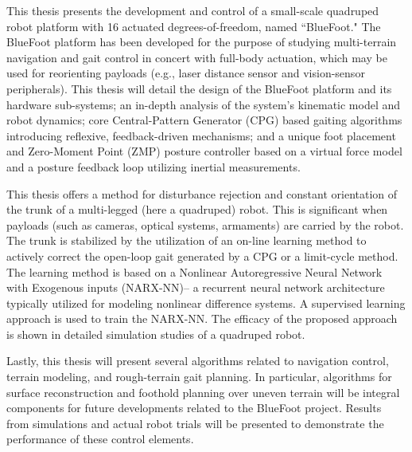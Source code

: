 {

	This thesis presents the development and control of a small-scale quadruped robot platform with 16 actuated degrees-of-freedom, named ``BlueFoot." The BlueFoot platform has been developed for the purpose of studying multi-terrain navigation and gait control in concert with full-body actuation, which may be used for reorienting payloads (e.g., laser distance sensor and vision-sensor peripherals). This thesis will detail the design of the BlueFoot platform and its hardware sub-systems; an in-depth analysis of the system's kinematic model and robot dynamics; core Central-Pattern Generator (CPG) based gaiting algorithms introducing reflexive, feedback-driven mechanisms; and a unique foot placement and Zero-Moment Point (ZMP) posture controller based on a virtual force model and a posture feedback loop utilizing inertial measurements. %

	This thesis offers a method for disturbance rejection and constant orientation of the trunk of a multi-legged (here a quadruped) robot. This is significant when payloads (such as cameras, optical systems, armaments) are carried by the robot.  The trunk is stabilized by the utilization of an on-line learning method to actively correct the open-loop gait generated by a CPG or a limit-cycle method. The learning method is based on a Nonlinear Autoregressive Neural Network with Exogenous inputs (NARX-NN)-- a recurrent neural network architecture typically utilized for modeling nonlinear difference systems. A supervised learning approach is used to train the NARX-NN. 
	The efficacy of the proposed approach is shown in detailed simulation studies of a quadruped robot. 

	Lastly, this thesis will present several algorithms related to navigation control, terrain modeling, and rough-terrain gait planning. In particular, algorithms for surface reconstruction and foothold planning over uneven terrain will be integral components for future developments related to the BlueFoot project. Results from simulations and actual robot trials will be presented to demonstrate the performance of these control elements. 
\endmsabstract}